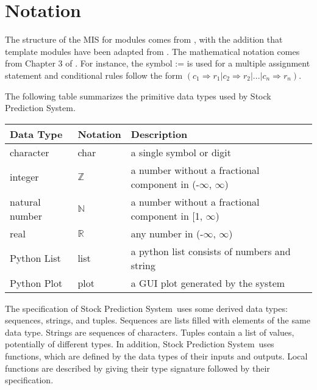 \documentclass[12pt, titlepage]{article}
\newcommand{\progname}{Stock Prediction System}
\begin{document}
\section{Notation}

The structure of the MIS for modules comes from \citet{HoffmanAndStrooper1995},
with the addition that template modules have been adapted from
\cite{GhezziEtAl2003}. The mathematical notation comes from Chapter 3 of
\citet{HoffmanAndStrooper1995}. For instance, the symbol := is used for a
multiple assignment statement and conditional rules follow the form $(c_1
\Rightarrow r_1 | c_2 \Rightarrow r_2 | ... | c_n \Rightarrow r_n )$.

The following table summarizes the primitive data types used by \progname. 

\begin{center}
\renewcommand{\arraystretch}{1.2}
\noindent 
\begin{tabular}{l l p{7.5cm}} 
\toprule 
\textbf{Data Type} & \textbf{Notation} & \textbf{Description}\\ 
\midrule
character & char & a single symbol or digit\\
integer & $\mathbb{Z}$ & a number without a fractional component in (-$\infty$, $\infty$) \\
natural number & $\mathbb{N}$ & a number without a fractional component in [1, $\infty$) \\
real & $\mathbb{R}$ & any number in (-$\infty$, $\infty$)\\
Python List &list & a python list consists of numbers and string\\
Python Plot & plot & a GUI plot generated by the system\\
\bottomrule
\end{tabular} 
\end{center}


\noindent
The specification of \progname \ uses some derived data types: sequences, strings, and
tuples. Sequences are lists filled with elements of the same data type. Strings
are sequences of characters. Tuples contain a list of values, potentially of
different types. In addition, \progname \ uses functions, which
are defined by the data types of their inputs and outputs. Local functions are
described by giving their type signature followed by their specification.
\end{document}
